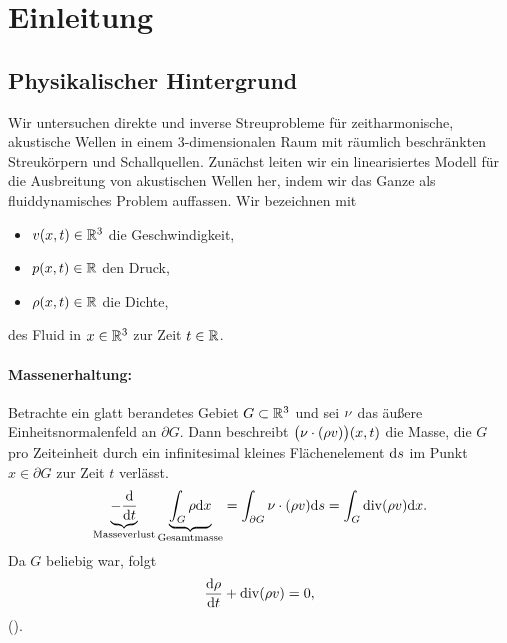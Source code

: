 \renewcommand\thesection{\Roman{section}}
\section{Einleitung}
\renewcommand\thesection{\arabic{section}}
\renewcommand\thesubsection{\arabic{subsection}}

\subsection{Physikalischer Hintergrund}

Wir untersuchen direkte und inverse Streuprobleme für zeitharmonische, akustische Wellen in einem 3-dimensionalen Raum mit räumlich beschränkten Streukörpern und Schallquellen. Zunächst leiten wir ein linearisiertes Modell für die Ausbreitung von akustischen Wellen her, indem wir das Ganze als fluiddynamisches Problem auffassen. Wir bezeichnen mit
\begin{itemize}
	\item \(v(x,t)\in\mathbb{R}^3\) die Geschwindigkeit,
	\item \(p(x,t)\in\mathbb{R}\) den Druck,
	\item \(\rho(x,t)\in\mathbb{R}\) die Dichte,
\end{itemize}
des Fluid in \(x\in\mathbb{R}^3\) zur Zeit \(t\in\mathbb{R}\).

\paragraph{Massenerhaltung:} Betrachte ein glatt berandetes Gebiet \(G\subset\mathbb{R}^3\) und sei \(\nu\) das äußere Einheitsnormalenfeld an \(\partial G\). Dann beschreibt \(\big(\nu\cdot(\rho v)\big)(x,t)\) die Masse, die \(G\) pro Zeiteinheit durch ein infinitesimal kleines Flächenelement \(\mathrm{d}s\) im Punkt \(x\in\partial G\) zur Zeit \(t\) verlässt.
\begin{equation*}
	\underbrace{-\frac{\mathrm{d}}{\mathrm{d}t}}_{\text{Masseverlust}}\underbrace{\int_G\rho\mathrm{d}x}_{\text{Gesamtmasse}}=\int_{\partial G}\nu\cdot(\rho v)\mathrm{d}s=\int_G\operatorname{div}(\rho v)\mathrm{d}x.
\end{equation*}
Da \(G\) beliebig war, folgt
\begin{equation}
	\label{Massenerhaltung}
	\frac{\mathrm{d}\rho}{\mathrm{d}t}+\operatorname{div}(\rho v)=0,
\end{equation}
().

